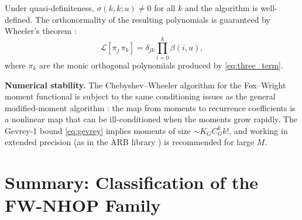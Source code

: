 \documentclass{article}
\begin{document}
Under quasi-definiteness, $\sigma(k,k;u) \ne 0$ for all $k$ and the
algorithm is well-defined. The orthonormality of the resulting polynomials
is guaranteed by Wheeler's theorem \cite{Wheeler1974}:
\begin{equation}\label{eq:wheeler_norm}
  \mathcal{L}[\pi_j\,\pi_k] = \delta_{jk}\prod_{i=0}^{k}\beta(i,u),
\end{equation}
where $\pi_k$ are the monic orthogonal polynomials produced by
\eqref{eq:three_term}.

\medskip
\noindent\textbf{Numerical stability.}
The Chebyshev--Wheeler algorithm for the Fox--Wright moment functional is
subject to the same conditioning issues as the general modified-moment
algorithm \cite{Gautschi1994,Gautschi1998}: the map from moments to
recurrence coefficients is a nonlinear map that can be ill-conditioned when
the moments grow rapidly. The Gevrey-1 bound \eqref{eq:gevrey} implies
moments of size $\sim K_G C_G^k k!$, and working in extended precision (as
in the ARB library \cite{Johansson2017}) is recommended for large $M$.

\section{Summary: Classification of the FW-NHOP Family}
\end{document}
